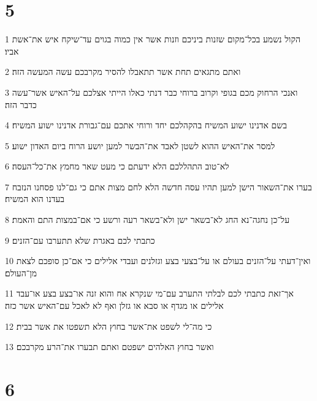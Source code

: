 \chapter{5}

\par 1 הקול נשמע בכל־מקום שזנות ביניכם וזנות אשר אין כמוה בגוים עד־שיקח איש את־אשת אביו׃
\par 2 ואתם מתגאים תחת אשר תתאבלו להסיר מקרבכם עשה המעשה הזה׃
\par 3 ואנכי הרחוק מכם בגופי וקרוב ברוחי כבר דנתי כאלו הייתי אצלכם על־האיש אשר־עשה כדבר הזה׃
\par 4 בשם אדנינו ישוע המשיח בהקהלכם יחד ורוחי אתכם עם־גבורת אדנינו ישוע המשיח׃
\par 5 למסר את־האיש ההוא לשטן לאבד את־הבשר למען יושע הרוח ביום האדון ישוע׃
\par 6 לא־טוב התהללכם הלא ידעתם כי מעט שאר מחמץ את־כל־העסה׃
\par 7 בערו את־השאור הישן למען תהיו עסה חדשה הלא לחם מצות אתם כי גם־לנו פסחנו הנזבח בעדנו הוא המשיח׃
\par 8 על־כן נחגה־נא החג לא־בשאר ישן ולא־בשאר רעה ורשע כי אם־במצות התם והאמת׃
\par 9 כתבתי לכם באגרת שלא תתערבו עם־הזנים׃
\par 10 ואין־דעתי על־הזנים בעולם או על־בצעי בצע וגזלנים ועבדי אלילים כי אם־כן סופכם לצאת מן־העולם׃
\par 11 אך־זאת כתבתי לכם לבלתי התערב עם־מי שנקרא אח והוא זנה או־בצע בצע או־עבד אלילים או מגדף או סבא או גזלן ואף לא לאכל עם־האיש אשר כזה׃
\par 12 כי מה־לי לשפט את־אשר בחוץ הלא תשפטו את אשר בבית׃
\par 13 ואשר בחוץ האלהים ישפטם ואתם תבערו את־הרע מקרבכם׃

\chapter{6}

